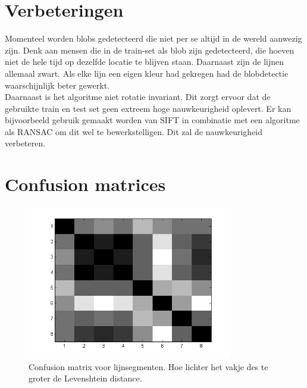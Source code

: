 \documentclass[a4paper]{article}
\begin{document}
\section{Verbeteringen}
Momenteel worden blobs gedetecteerd die niet per se altijd in de wereld aanwezig zijn. Denk aan mensen die in de train-set als blob zijn gedetecteerd, die hoeven niet de hele tijd op dezelfde locatie te blijven staan. Daarnaast zijn de lijnen allemaal zwart. Als elke lijn een eigen kleur had gekregen had de blobdetectie waarschijnlijk beter gewerkt.\\
Daarnaast is het algoritme niet rotatie invariant. Dit zorgt ervoor dat de gebruikte train en test set geen extreem hoge nauwkeurigheid oplevert. Er kan bijvoorbeeld gebruik gemaakt worden van SIFT in combinatie met een algoritme als RANSAC om dit wel te bewerkstelligen. Dit zal de nauwkeurigheid verbeteren.

\section{Confusion matrices}

\begin{figure}[h]
	\centering
	\includegraphics[width=0.8\textwidth]{confusion_line.jpg}
	\caption{Confusion matrix voor lijnsegmenten. Hoe lichter het vakje des te groter de Levenshtein distance.}
	\label{fig:confusion_line}
\end{figure}
\end{document}

